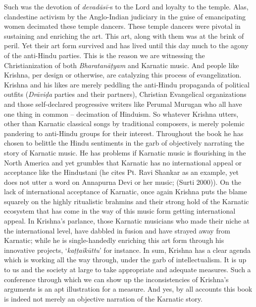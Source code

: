 {Such was the devotion of \textit{devadāsī-}s to the Lord and loyalty to the temple. Alas, clandestine activism by the Anglo-Indian judiciary in the guise of emancipating women decimated these temple dancers. These temple dancers were pivotal in sustaining and enriching the art. This art, along with them was at the brink of peril. Yet their art form survived and has lived until this day much to the agony of the anti-Hindu parties. This is the reason we are witnessing the Christianization of both \textit{Bharatanāṭyam} and Karnatic music. And people like Krishna, per design or otherwise, are catalyzing this process of evangelization. Krishna and his likes are merely peddling the anti-Hindu propaganda of political outfits (\textit{Drāviḍa} parties and their partners), Christian Evangelical organizations and those self-declared progressive writers like Perumal Murugan who all have one thing in common – decimation of Hinduism. So whatever Krishna utters, other than Karnatic classical songs by traditional composers, is merely polemic pandering to anti-Hindu groups for their interest. Throughout the book he has chosen to belittle the Hindu sentiments in the garb of objectively narrating the story of Karnatic music. He has problems if Karnatic music is flourishing in the North America and yet grumbles that Karnatic has no international appeal or acceptance like the Hindustani (he cites Pt. Ravi Shankar as an example, yet does not utter a word on Annapurna Devi or her music; (Surti 2000)). On the lack of international acceptance of Karnatic, once again Krishna puts the blame squarely on the highly ritualistic brahmins and their strong hold of the Karnatic ecosystem that has come in the way of this music form getting international appeal. In Krishna’s parlance, those Karnatic musicians who made their niche at the international level, have dabbled in fusion and have strayed away from Karnatic; while he is single-handedly enriching this art form through his innovative projects, ‘\textit{kaṭṭaikūttu}’ for instance. In sum, Krishna has a clear agenda which is working all the way through, under the garb of intellectualism. It is up to us and the society at large to take appropriate and adequate measures. Such a conference through which we can show up the inconsistencies of Krishna’s arguments is an apt illustration for a measure. And yes, by all accounts this book is indeed not merely an objective narration of the Karnatic story.


}
